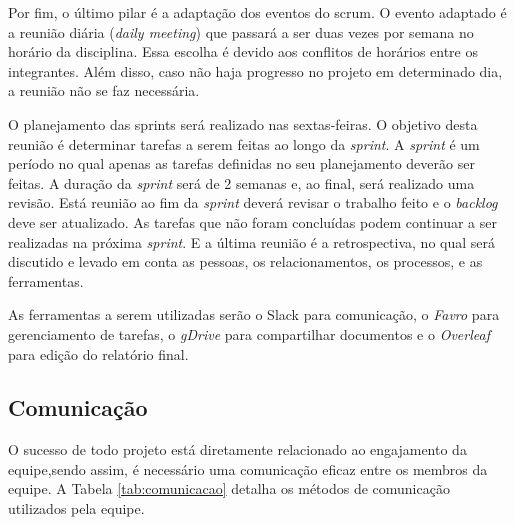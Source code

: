 Por fim, o último pilar é a adaptação dos eventos do scrum. O evento adaptado é a reunião diária (\textit{daily meeting}) que passará a ser duas vezes por semana no horário da disciplina. Essa escolha é devido aos conflitos de horários entre os integrantes. Além disso, caso não haja progresso no projeto em determinado dia, a reunião não se faz necessária.

	O planejamento das sprints será realizado nas sextas-feiras. O objetivo desta reunião é determinar tarefas a serem feitas ao longo da \textit{sprint}. A \textit{sprint} é um período no qual apenas as tarefas definidas no seu planejamento deverão ser feitas. A duração da \textit{sprint} será de 2 semanas e, ao final, será realizado uma revisão. Está reunião ao fim da \textit{sprint} deverá revisar o trabalho feito e o \textit{backlog} deve ser atualizado. As tarefas que não foram concluídas podem continuar a ser realizadas na próxima \textit{sprint}. E a última reunião é a retrospectiva, no qual será discutido e levado em conta as pessoas, os relacionamentos, os processos, e as ferramentas.
    
    As ferramentas a serem utilizadas serão o Slack para comunicação, o \textit{Favro} para gerenciamento de tarefas, o \textit{gDrive} para compartilhar  documentos e o \textit{Overleaf} para edição do relatório final.


\subsection{Comunicação}


O sucesso de todo projeto está diretamente relacionado ao engajamento da equipe,sendo assim, é necessário uma comunicação eficaz entre os membros da equipe. A Tabela \ref{tab:comunicacao} detalha os métodos de comunicação utilizados pela equipe.

\begin{table}[H]
\centering
\caption{Métodos de comunicação.}
\label{tab:comunicacao}
\end{table}



